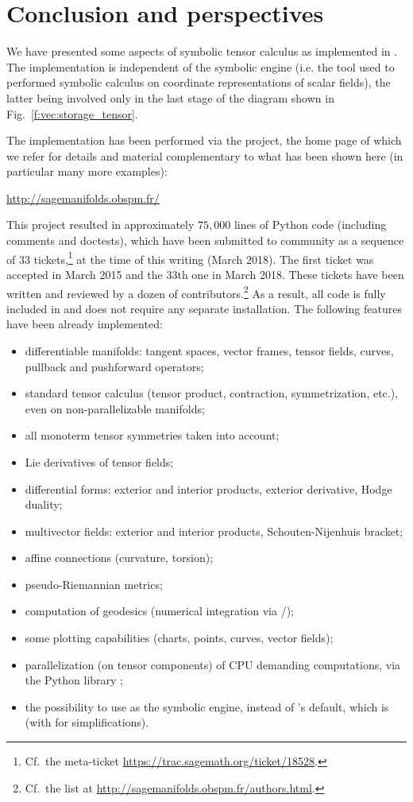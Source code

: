 \chapter{Conclusion and perspectives} \label{s:con}

We have presented some aspects of symbolic tensor calculus as implemented
in \Sage{}. The implementation is independent of the symbolic engine (i.e. the
tool used to performed symbolic calculus on coordinate representations of
scalar fields), the latter being involved only in the last stage of the diagram
shown in Fig.~\ref{f:vec:storage_tensor}.

The implementation has been performed via the 
project, the home page of which we refer for details and material complementary
to what has been shown here (in particular many more examples):
\begin{center}
\url{http://sagemanifolds.obspm.fr/}
\end{center}
This project resulted in approximately $75,000$ lines of Python code (including comments and doctests), which have been submitted to \Sage{} community as a sequence of
33 tickets,\footnote{Cf.\ the meta-ticket \url{https://trac.sagemath.org/ticket/18528}.}
at the time of this writing (March 2018). The
first ticket was accepted in March 2015 and the 33th one in March 2018.
These tickets have been written and reviewed by a dozen of
contributors.\footnote{Cf.\ the list at \url{http://sagemanifolds.obspm.fr/authors.html}.}
As a result, all code is fully included in  and does not require
any separate installation. The following features have been already implemented:
\begin{itemize}
\item differentiable manifolds: tangent spaces, vector frames, tensor fields, curves, pullback and pushforward operators;
\item standard tensor calculus (tensor product, contraction, symmetrization, etc.), even on non-parallelizable manifolds;
\item all monoterm tensor symmetries taken into account;
\item Lie derivatives of tensor fields;
\item differential forms: exterior and interior products, exterior derivative,
Hodge duality;
\item multivector fields: exterior and interior products, Schouten-Nijenhuis bracket;
\item affine connections (curvature, torsion);
\item pseudo-Riemannian metrics;
\item computation of geodesics (numerical integration via \Sage{}/);
\item some plotting capabilities (charts, points, curves, vector fields);
\item parallelization (on tensor components) of CPU demanding computations,
via the Python library ;
\item the possibility to use  as the symbolic engine, instead of
\Sage{}'s default, which is  (with  for simplifications).
\end{itemize}

